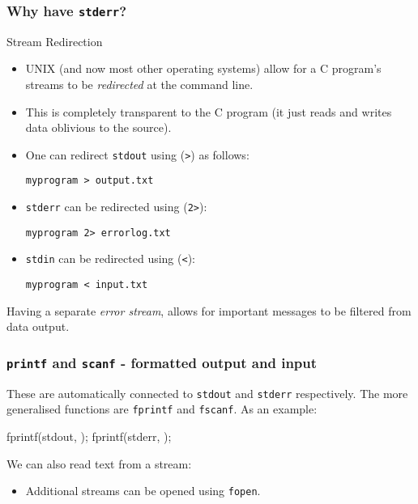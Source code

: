 \documentclass[smaller,table]{beamer} %
\begin{document}
\begin{frame}
\frametitle{Why have {\tt stderr}?}
\begin{exampleblock}{Stream Redirection}
\begin{itemize}
\item UNIX (and now most other operating systems) allow for a C program's streams to be \emph{redirected} at the command line.
\item This is completely transparent to the C program (it just reads and writes data oblivious to the source).
\item One can redirect {\tt stdout} using ({\tt >}) as follows:
\begin{center}
\tt myprogram > output.txt
\end{center}
\item {\tt stderr} can be redirected using ({\tt 2>}):
\begin{center}
\tt myprogram 2> errorlog.txt
\end{center}
\item {\tt stdin} can be redirected using ({\tt <}):
\begin{center}
\tt myprogram < input.txt
\end{center}
\end{itemize}
\end{exampleblock}
Having a separate \emph{error stream}, allows for important messages to be filtered from data output.
\end{frame}


\begin{frame}[fragile]
\frametitle{{\tt printf} and {\tt scanf} - formatted output and input}
These are automatically connected to {\tt stdout} and {\tt stderr} respectively. The more generalised functions are {\tt fprintf} and {\tt fscanf}. As an example:
\begin{semiverbatim}
fprintf(stdout, );
fprintf(stderr, );
\end{semiverbatim}
We can also read text from a stream:
\begin{itemize}
\item Additional streams can be opened using {\tt fopen}.
\end{itemize}
\end{frame}
\end{document}
